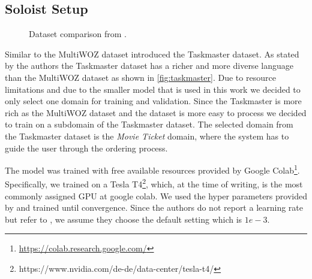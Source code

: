 \documentclass[twocolumn]{tum-article}
\begin{document}
\subsection{Soloist Setup}\label{sec:soloist_setup}
\begin{figure}[!h]
\centering
{}
\caption{Dataset comparison from \cite{byrne2019taskmaster}.}
\label{fig:taskmaster}
\end{figure}
Similar to the MultiWOZ dataset \cite{byrne2019taskmaster} introduced the Taskmaster dataset. As stated by the authors the Taskmaster dataset has a richer and more diverse language than the MultiWOZ dataset as shown in \autoref{fig:taskmaster}. Due to resource limitations and due to the smaller model that is used in this work we decided to only select one domain for training and validation. Since the Taskmaster is more rich as the MultiWOZ dataset and the dataset is more easy to process we decided to train on a subdomain of the Taskmaster dataset. The selected domain from the Taskmaster dataset is the \textit{Movie Ticket} domain, where the system has to guide the user through the ordering process. 

The model was trained with free available resources provided by Google Colab\footnote{\url{https://colab.research.google.com/}}. Specifically, we trained on a Tesla T4\footnote{https://www.nvidia.com/de-de/data-center/tesla-t4/}, which, at the time of writing, is the most commonly assigned GPU at google colab. We used the hyper parameters provided by \cite{peng2020soloist} and trained until convergence. Since the authors do not report a learning rate but refer to \cite{kingma2014adam}, we assume they choose the default setting which is $1e-3$. 
\end{document}
